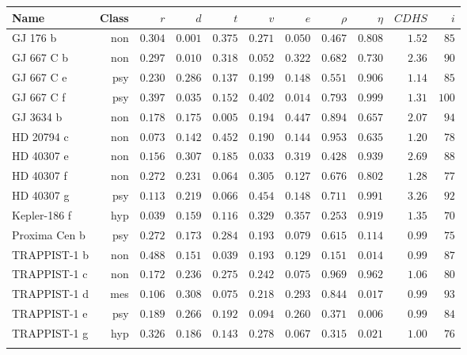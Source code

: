 \begin{tabular}{l r r r r r r r r r r}
  \toprule
  Name & Class & $r$ & $d$ & $t$ & $v$ & $e$ & $\rho$ & $\eta$ & $\mathit{CDHS}$ & $i$\\
  \midrule
GJ 176 b & non & $0.304$ & $0.001$ & $0.375$ & $0.271$ & $0.050$ & $0.467$ & $0.808$ & $1.52$ & $ 85$\\
GJ 667 C b & non & $0.297$ & $0.010$ & $0.318$ & $0.052$ & $0.322$ & $0.682$ & $0.730$ & $2.36$ & $ 90$\\
GJ 667 C e & psy & $0.230$ & $0.286$ & $0.137$ & $0.199$ & $0.148$ & $0.551$ & $0.906$ & $1.14$ & $ 85$\\
GJ 667 C f & psy & $0.397$ & $0.035$ & $0.152$ & $0.402$ & $0.014$ & $0.793$ & $0.999$ & $1.31$ & $100$\\
GJ 3634 b & non & $0.178$ & $0.175$ & $0.005$ & $0.194$ & $0.447$ & $0.894$ & $0.657$ & $2.07$ & $ 94$\\
HD 20794 c & non & $0.073$ & $0.142$ & $0.452$ & $0.190$ & $0.144$ & $0.953$ & $0.635$ & $1.20$ & $ 78$\\
HD 40307 e & non & $0.156$ & $0.307$ & $0.185$ & $0.033$ & $0.319$ & $0.428$ & $0.939$ & $2.69$ & $ 88$\\
HD 40307 f & non & $0.272$ & $0.231$ & $0.064$ & $0.305$ & $0.127$ & $0.676$ & $0.802$ & $1.28$ & $ 77$\\
HD 40307 g & psy & $0.113$ & $0.219$ & $0.066$ & $0.454$ & $0.148$ & $0.711$ & $0.991$ & $3.26$ & $ 92$\\
Kepler-186 f & hyp & $0.039$ & $0.159$ & $0.116$ & $0.329$ & $0.357$ & $0.253$ & $0.919$ & $1.35$ & $ 70$\\
Proxima Cen b & psy & $0.272$ & $0.173$ & $0.284$ & $0.193$ & $0.079$ & $0.615$ & $0.114$ & $0.99$ & $ 75$\\
TRAPPIST-1 b & non & $0.488$ & $0.151$ & $0.039$ & $0.193$ & $0.129$ & $0.151$ & $0.014$ & $0.99$ & $ 87$\\
TRAPPIST-1 c & non & $0.172$ & $0.236$ & $0.275$ & $0.242$ & $0.075$ & $0.969$ & $0.962$ & $1.06$ & $ 80$\\
TRAPPIST-1 d & mes & $0.106$ & $0.308$ & $0.075$ & $0.218$ & $0.293$ & $0.844$ & $0.017$ & $0.99$ & $ 93$\\
TRAPPIST-1 e & psy & $0.189$ & $0.266$ & $0.192$ & $0.094$ & $0.260$ & $0.371$ & $0.006$ & $0.99$ & $ 84$\\
TRAPPIST-1 g & hyp & $0.326$ & $0.186$ & $0.143$ & $0.278$ & $0.067$ & $0.315$ & $0.021$ & $1.00$ & $ 76$\\
  \bottomrule\\
\end{tabular}


